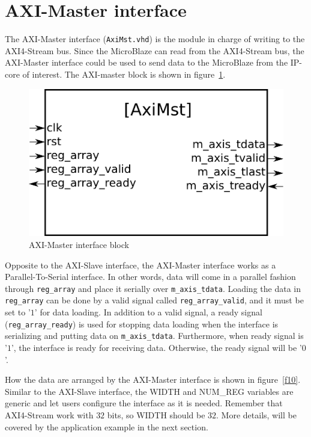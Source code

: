 \section{AXI-Master interface}

The AXI-Master interface ({\tt AxiMst.vhd}) is the module in charge of writing to the AXI4-Stream bus. Since the MicroBlaze can read from the AXI4-Stream bus, the AXI-Master interface could be used to send data to the MicroBlaze from the IP-core of interest. The AXI-master block is shown in figure~\ref{f9}.

\begin{figure}[!h]
\includegraphics[scale=0.25]{images/axiMstBlock.png}
\caption{AXI-Master interface block}
\label{f9}
\end{figure}

Opposite to the AXI-Slave interface, the AXI-Master interface works as a Parallel-To-Serial interface. In other words, data will come in a parallel fashion through {\tt reg\_array} and place it serially over {\tt m\_axis\_tdata}. Loading the data in {\tt reg\_array} can be done by a valid signal called {\tt reg\_array\_valid}, and it must be set to '$1$' for data loading. In addition to a valid signal, a ready signal ({\tt reg\_array\_ready}) is used for stopping data loading when the interface is serializing and putting data on {\tt m\_axis\_tdata}. Furthermore, when ready signal is '$1$', the interface is ready for receiving data. Otherwise, the ready signal will be '$0$'.

How the data are arranged by the AXI-Master interface is shown in figure~\ref{f10}. Similar to the AXI-Slave interface, the WIDTH and NUM\_REG variables are generic and let users configure the interface as it is needed. Remember that AXI4-Stream work with $32$ bits, so WIDTH should be $32$. More details, will be covered by the application example in the next section.

